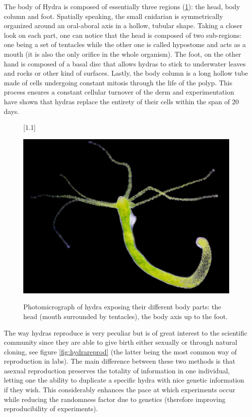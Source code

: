 The body of Hydra is composed of essentially three regions (\ref{fig:hydrabody}): the head, body column and foot. Spatially speaking, the small cnidarian is symmetrically organized around an oral-aboral axis in a hollow, tubular shape. Taking a closer look on each part, one can notice that the head is composed of two sub-regions: one being a set of tentacles while the other one is called hypostome and acts as a mouth (it is also the only orifice in the whole organism). The foot, on the other hand is composed of a basal disc that allows hydras to stick to underwater leaves and rocks or other kind of surfaces. Lastly, the body column is a long hollow tube made of cells undergoing constant mitosis through the life of the polyp. This process ensures a constant cellular turnover of the derm and experimentation have shown that hydras replace the entirety of their cells within the span of 20 days.

\begin{figure}
	[1.1\FBwidth]
	{\caption{Photomicrograph of hydra exposing their different body parts: the head (mouth surrounded by tentacles), the body axis up to the foot.  }\label{fig:hydrabody}}
	{\includegraphics[width=0.9\linewidth]{figures/hydra.png}}
\end{figure}

\begin{remark}
	The way hydras reproduce is very peculiar but is of great interest to the scientific community since they are able to give birth either sexually or through natural cloning, see figure \ref{fig:hydrareprod} (the latter being the most common way of reproduction in labs). The main difference between these two methods is that asexual reproduction preserves the totality of information in one individual, letting one the ability to duplicate a specific hydra with nice genetic information if they wish. This considerably enhances the pace at which experiments occur while reducing the randomness factor due to genetics (therefore improving reproducibility of experiments). 
\end{remark}

